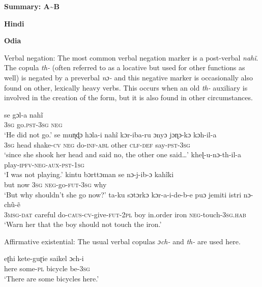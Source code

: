 ﻿\documentclass[output=paper]{langsci/langscibook}
\begin{document}
\begin{unindented}
\textbf{Summary: A{\textasciitilde}B}

\textbf{Hindi} \parencite[see][]{Bashir2006}

\textbf{Odia} \parencite{NeukomPatnaik2003}

Verbal negation: The most common verbal negation marker is a post-verbal \textit{nahĩ}. The copula \textit{th-} (often referred to as a locative but used for other functions as well) is negated by a preverbal \textit{nɔ-} and this negative marker is occasionally also found on other, lexically heavy verbs. This occurs when an old \textit{th-} auxiliary is involved in the creation of the form, but it is also found in other circumstances.
%
\begin{exe}\ex \gll se gɔl-a nahĩ \\
\textsc{3sg}   go.\textsc{pst-3sg}  \textsc{neg} \\
    \glt `He did not go.' \parencite[340]{NeukomPatnaik2003}
\ex \gll se muɳɖɔ hɔla-i nahĩ kɔr-iba-ru ɔnyɔ jɔɳɔ-kɔ kɔh-il-a \\
\textsc{3sg} head shake-\textsc{cv} \textsc{neg} do-\textsc{inf-abl} other \textsc{clf-def} say-\textsc{pst-3sg} \\
    \glt `since she shook her head and said no, the other one
said…'\parencite[43]{NeukomPatnaik2003}
\ex \gll kheɭ-u-nɔ-th-il-a \\
play-\textsc{ipfv-neg-aux-pst-1sg} \\
    \glt `I was not playing.' \parencite[340]{NeukomPatnaik2003}
\ex \gll kintu bɔrttɔman se nɔ-j-ib-ɔ kahĩki \\
but now \textsc{3sg} \textsc{neg}-go-\textsc{fut-3sg} why \\
    \glt `But why shouldn't she go now?’ \parencite[341]{NeukomPatnaik2003}
\ex \gll ta-ku sɔtɔrkɔ kɔr-a-i-de-b-e puɔ jemiti istri nɔ-chũ-ẽ\\
\textsc{3msg-dat} careful do-\textsc{caus-cv}-give-\textsc{fut-2pl} boy in.order iron \textsc{neg}-touch-\textsc{3sg.hab} \\
    \glt `Warn her that the boy should not touch the iron.' \parencite[155]{NeukomPatnaik2003}
    \end{exe}
%
Affirmative existential: The usual verbal copulas \textit{ɔch-} and \textit{th-} are used here.
%
\begin{exe}\ex \gll eʈhi kete-guɽie  saikel  ɔch-i   \\
here some-\textsc{pl}  bicycle be-\textsc{3sg} \\
    \glt `There are some bicycles here.' \parencite[47]{NeukomPatnaik2003}

\end{exe}
\end{unindented}
\end{document}
